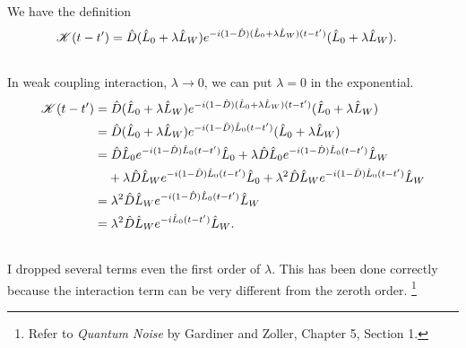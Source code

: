 \documentclass[letterpaper,10pt,english]{sphinxmanual}
\begin{document}
We have the definition
\begin{gather}
\begin{split}\mathscr K(t-t') & = \hat D (\hat L_0 + \lambda \hat L_W ) e^{-i(1-\hat D)  (\hat L_0 + \lambda \hat L_W ) (t-t')} (\hat L_0 + \lambda \hat L_W ) .\end{split}\notag\\\begin{split}\end{split}\notag
\end{gather}
In weak coupling interaction, $\lambda \rightarrow 0$, we can put $\lambda = 0$ in the exponential.
\begin{gather}
\begin{split}\mathscr K(t-t')  &=  \hat D (\hat L_0 + \lambda \hat L_W ) e^{-i(1-\hat D)  (\hat L_0 + \lambda \hat L_W ) (t-t')} (\hat L_0 + \lambda \hat L_W )  \\
&= \hat D (\hat L_0 + \lambda \hat L_W ) e^{-i(1-\hat D)  \hat L_0 (t-t')} (\hat L_0 + \lambda \hat L_W ) \\
&= \hat D \hat L_0  e^{-i(1-\hat D)  \hat L_0 (t-t')} \hat L_0  + \lambda \hat D \hat L_0  e^{-i(1-\hat D)  \hat L_0 (t-t')}   \hat L_W   \\
\phantom{\mathscr K(t-t')} & \phantom{{} = } + \lambda \hat D  \hat L_W  e^{-i(1-\hat D)  \hat L_0 (t-t')} \hat L_0  + \lambda^2 \hat D   \hat L_W  e^{-i(1-\hat D)  \hat L_0 (t-t')}  \hat L_W  \\
&=  \lambda^2 \hat D   \hat L_W  e^{-i(1-\hat D)  \hat L_0 (t-t')}  \hat L_W  \\
&=  \lambda^2 \hat D   \hat L_W  e^{-i\hat L_0 (t-t')}  \hat L_W  .\end{split}\notag\\\begin{split}\end{split}\notag
\end{gather}
I dropped several terms even the first order of $\lambda$. This has been done correctly because the interaction term can be very different from the zeroth order. \footnote{
Refer to \emph{Quantum Noise} by Gardiner and Zoller, Chapter 5, Section 1.
}
\end{document}
